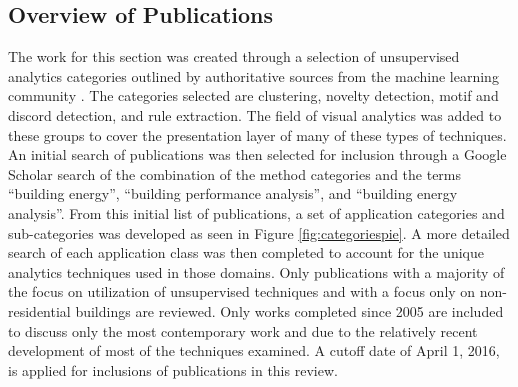 \subsection{Overview of Publications}
\label{Overview}
The work for this section was created through a selection of unsupervised analytics categories outlined by authoritative sources from the machine learning community \citep{hastie_elements_2009,james_introduction_2013,duda_pattern_2012,mirkin_clustering:_2012}. The categories selected are clustering, novelty detection, motif and discord detection, and rule extraction. The field of visual analytics was added to these groups to cover the presentation layer of many of these types of techniques. An initial search of publications was then selected for inclusion through a Google Scholar search of the combination of the method categories and the terms ``building energy'', ``building performance analysis'', and ``building energy analysis''. From this initial list of publications, a set of application categories and sub-categories was developed as seen in Figure \ref{fig:categoriespie}. A more detailed search of each application class was then completed to account for the unique analytics techniques used in those domains. Only publications with a majority of the focus on utilization of unsupervised techniques and with a focus only on non-residential buildings are reviewed. Only works completed since 2005 are included to discuss only the most contemporary work and due to the relatively recent development of most of the techniques examined. A cutoff date of April 1, 2016, is applied for inclusions of publications in this review.